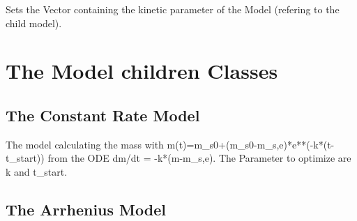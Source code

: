 \documentclass[letterpaper,10pt,english]{sphinxmanual}
\begin{document}
\begin{fulllineitems}
\begin{fulllineitems}
\end{fulllineitems}


\begin{fulllineitems}
\label{FittingClasses:Models.Model.setParamVector}
Sets the Vector containing the kinetic parameter of the Model (refering to the child model).

\end{fulllineitems}


\end{fulllineitems}



\section{The Model children Classes}
\label{FittingClasses:the-model-children-classes}

\subsection{The Constant Rate Model}
\label{FittingClasses:the-constant-rate-model}

\begin{fulllineitems}
\label{FittingClasses:Models.ConstantRateModel}
The model calculating the mass with m(t)=m\_s0+(m\_s0-m\_s,e)*e**(-k*(t-t\_start)) from the ODE dm/dt = -k*(m-m\_s,e). The Parameter to optimize are k and t\_start.

\end{fulllineitems}



\subsection{The Arrhenius Model}
\label{FittingClasses:the-arrhenius-model}
\end{document}
